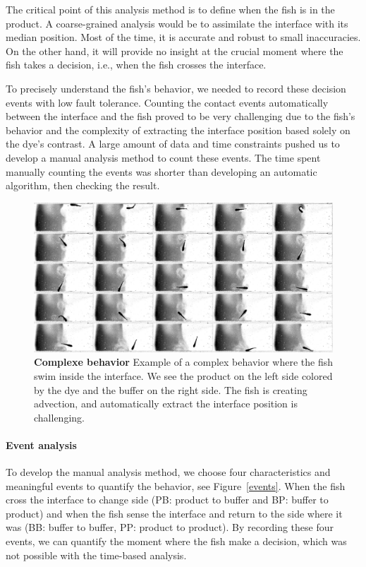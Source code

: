   The critical point of this analysis method is to define when the fish is in the product. A coarse-grained analysis would be to assimilate the interface with its median position. Most of the time, it is accurate and robust to small inaccuracies. On the other hand, it will provide no insight at the crucial moment where the fish takes a decision, i.e., when the fish crosses the interface.

  To precisely understand the fish's behavior, we needed to record these decision events with low fault tolerance. Counting the contact events automatically between the interface and the fish proved to be very challenging due to the fish's behavior and the complexity of extracting the interface position based solely on the dye's contrast. A large amount of data and time constraints pushed us to develop a manual analysis method to count these events. The time spent manually counting the events was shorter than developing an automatic algorithm, then checking the result.

    \begin{figure}[htp]
      \centering
      \includegraphics[width=1\textwidth]{part_2/assets/behavior.jpg}
      \caption{\textbf{Complexe behavior} Example of a complex behavior where the fish swim inside the interface. We see the product on the left side colored by the dye and the buffer on the right side. The fish is creating advection, and automatically extract the interface position is challenging.}
      \label{behavior_comp}
    \end{figure}

  \paragraph{Event analysis} To develop the manual analysis method, we choose four characteristics and meaningful events to quantify the behavior, see Figure~\ref{events}. When the fish cross the interface to change side (PB: product to buffer and BP: buffer to product) and when the fish sense the interface and return to the side where it was (BB: buffer to buffer, PP: product to product). By recording these four events, we can quantify the moment where the fish make a decision, which was not possible with the time-based analysis.

